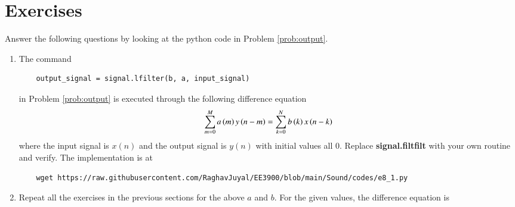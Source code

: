 \documentclass[journal,12pt,twocolumn]{IEEEtran}
\renewcommand\thesection{\arabic{section}}
\begin{document}
\section{Exercises}
\noindent Answer the following questions by looking at the python code in Problem \ref{prob:output}.
\begin{enumerate}[label=\thesection.\arabic*]
\item
The command
\begin{lstlisting}
	output_signal = signal.lfilter(b, a, input_signal)
\end{lstlisting}
in Problem \ref{prob:output} is executed through the following difference equation
\begin{equation}
	\label{eq:iir_filter_gen}
	\sum _{m=0}^{M}a\left(m\right)y\left(n-m\right)=\sum _{k=0}^{N}b\left(k\right)x\left(n-k\right)
\end{equation}
where the input signal is $x(n)$ and the output signal is $y(n)$ with initial values all 0. Replace
\textbf{signal.filtfilt} with your own routine and verify.
\solution
The implementation is at
\begin{lstlisting}
	wget https://raw.githubusercontent.com/RaghavJuyal/EE3900/blob/main/Sound/codes/e8_1.py
\end{lstlisting}
\item Repeat all the exercises in the previous sections for the above $a$ and $b$.
\solution
For the given values, the difference equation is
\begin{align}

\end{align}
\end{enumerate}
\end{document}
